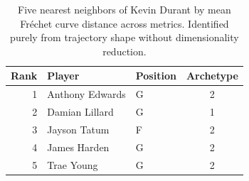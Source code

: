 \begin{table}[htbp]
  \centering\small
  \begin{tabular}{rllc}
    \toprule
    Rank & Player & Position & Archetype \\
    \midrule
    1 & Anthony Edwards & G & 2 \\
    2 & Damian Lillard & G & 1 \\
    3 & Jayson Tatum & F & 2 \\
    4 & James Harden & G & 2 \\
    5 & Trae Young & G & 2 \\
    \bottomrule
  \end{tabular}
  \caption{Five nearest neighbors of Kevin Durant by mean Fr\'{e}chet curve distance across metrics. Identified purely from trajectory shape without dimensionality reduction.}
  \label{tab:Kevin_Durant_frechet_curve_neighbors}
\end{table}

